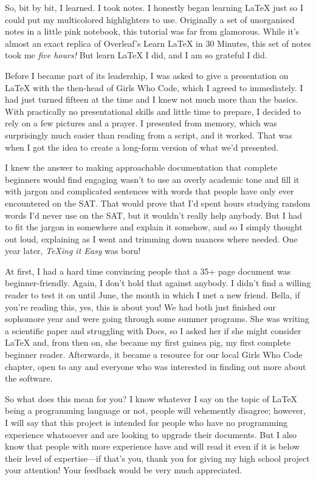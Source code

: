 \documentclass[letterpaper, 12pt]{article}
\begin{document}
So, bit by bit, I learned. I took notes. I honestly began learning \LaTeX{} just so I could put my multicolored highlighters to use. Originally a set of unorganised notes in a little pink notebook, this tutorial was far from glamorous. While it’s almost an exact replica of Overleaf’s Learn LaTeX in 30 Minutes, this set of notes took me \textit{five hours!} But learn \LaTeX{} I did, and I am so grateful I did.

Before I became part of its leadership, I was asked to give a presentation on LaTeX with the then-head of Girls Who Code, which I agreed to immediately. I had just turned fifteen at the time and I knew not much more than the basics. With practically no presentational skills and little time to prepare, I decided to rely on a few pictures and a prayer. I presented from memory, which was surprisingly much easier than reading from a script, and it worked. That was when I got the idea to create a long-form version of what we’d presented.

I knew the answer to making approachable documentation that complete beginners would find engaging wasn’t to use an overly academic tone and fill it with jargon and complicated sentences with words that people have only ever encountered on the SAT. That would prove that I’d spent hours studying random words I’d never use on the SAT, but it wouldn’t really help anybody. But I had to fit the jargon in somewhere and explain it somehow, and so I simply thought out loud, explaining as I went and trimming down nuances where needed. One year later, \textit{TeXing it Easy} was born!

At first, I had a hard time convincing people that a 35+ page document was beginner-friendly. Again, I don’t hold that against anybody. I didn’t find a willing reader to test it on until June, the month in which I met a new friend. Bella, if you’re reading this, yes, this is about you! We had both just finished our sophomore year and were going through some summer programs. She was writing a scientific paper and struggling with Docs, so I asked her if she might consider \LaTeX{} and, from then on, she became my first guinea pig, my first complete beginner reader. Afterwards, it became a resource for our local Girls Who Code chapter, open to any and everyone who was interested in finding out more about the software.

So what does this mean for you? I know whatever I say on the topic of LaTeX being a programming language or not, people will vehemently disagree; however, I will say that this project is intended for people who have no programming experience whatsoever and are looking to upgrade their documents. But I also know that people with more experience have and will read it even if it is below their level of expertise---if that’s you, thank you for giving my high school project your attention! Your feedback would be very much appreciated.
\end{document}
